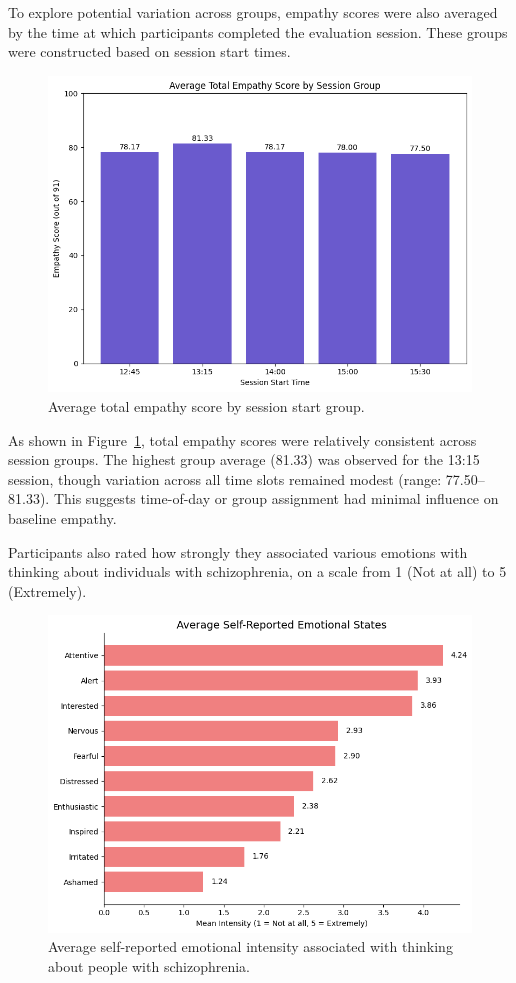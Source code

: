 To explore potential variation across groups, empathy scores were also averaged by the time at which participants completed the evaluation session. These groups were constructed based on session start times.

\begin{figure}[H]
    \centering
    \includegraphics[width=0.75\columnwidth]{../../Figures/avg score-by-group-pre.png}
    \caption{Average total empathy score by session start group.}
    \label{fig:group_scores_pre}
\end{figure}

As shown in Figure~\ref{fig:group_scores_pre}, total empathy scores were relatively consistent across session groups. The highest group average (81.33) was observed for the 13:15 session, though variation across all time slots remained modest (range: 77.50–81.33). This suggests time-of-day or group assignment had minimal influence on baseline empathy.

Participants also rated how strongly they associated various emotions with thinking about individuals with schizophrenia, on a scale from 1 (Not at all) to 5 (Extremely).

\begin{figure}[htbp]
    \centering
    \includegraphics[width=0.7\columnwidth]{../../Figures/avg-emotions-pre.png}
    \caption{Average self-reported emotional intensity associated with thinking about people with schizophrenia.}
    \label{fig:avg_emotions_pre}
\end{figure}


